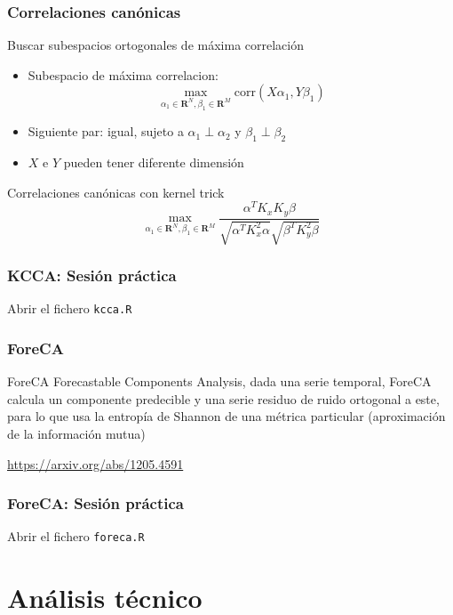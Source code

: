 \documentclass[t,9pt,pdftex]{beamer}
\begin{document}
\begin{frame}[c]
	\frametitle{Correlaciones can\'onicas}
	\begin{block}{Buscar subespacios ortogonales de m\'axima correlaci\'on}
		\begin{itemize}
		\item Subespacio de m\'axima correlacion: $$\max_{\alpha_1\in\mathbf{R}^N, \beta_1\in\mathbf{R}^M}{\mbox{corr}(X\alpha_1, Y\beta_1)}$$
		\item Siguiente par: igual, sujeto a $\alpha_1 \perp \alpha_2$ y $\beta_1 \perp \beta_2$
		\item $X$ e $Y$ pueden tener diferente dimensi\'on
		\end{itemize}
	\end{block}	
	\begin{block}{Correlaciones can\'onicas con kernel trick}
		$$
		\max_{\alpha_1\in\mathbf{R}^N, \beta_1\in\mathbf{R}^M} \frac{\alpha^T K_x K_y \beta}{\sqrt{\alpha^T K_x^2 \alpha} \sqrt{\beta^T K_y^2 \beta}}
		$$
	\end{block}
\end{frame}

\begin{frame}[c,containsverbatim]
\frametitle{KCCA: Sesi\'on pr\'actica}
	Abrir el fichero \texttt{kcca.R}
		
\end{frame}


\begin{frame}%
\frametitle{ForeCA}
	\begin{block}{ForeCA}
		Forecastable Components Analysis, dada una serie temporal, ForeCA calcula un componente predecible y una serie residuo de ruido ortogonal a este, para lo que usa la entrop\'ia de Shannon de una m\'etrica particular (aproximaci\'on de la informaci\'on mutua)
	\end{block}
	
	\url{https://arxiv.org/abs/1205.4591}
		
\end{frame}


\begin{frame}[c,containsverbatim]
\frametitle{ForeCA: Sesi\'on pr\'actica}
	Abrir el fichero \texttt{foreca.R}
		
\end{frame}




\section{An\'alisis t\'ecnico}
\end{document}
